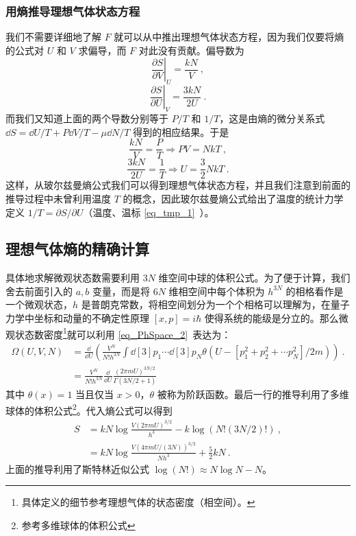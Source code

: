 \subsubsection{用熵推导理想气体状态方程}
我们不需要详细地了解 $F$ 就可以从中推出理想气体状态方程，因为我们仅要将熵的公式对 $U $ 和 $V$ 求偏导，而 $F$ 对此没有贡献。偏导数为
\begin{equation}
\left. \frac{\partial S}{\partial V} \right |_{U}^{}=\frac{kN}{V}~,
\end{equation}
\begin{equation}
\left. \frac{\partial S}{\partial U}\right |_{V}^{}=\frac{3kN}{2U}~.
\end{equation}
而我们又知道上面的两个导数分别等于 $P/T$ 和 $1/T$，这是由熵的微分关系式 $\dd S=\dd U/T+P\dd V/T-\mu \dd N/T$ 得到的相应结果。于是
\begin{equation}
\dfrac{kN}{V}=\dfrac{P}{T}\Rightarrow PV=NkT~,
\end{equation}
\begin{equation}
\dfrac{3kN}{2U} = \dfrac{1}{T}\Rightarrow U=\frac{3}{2}NkT~.
\end{equation}
这样，从玻尔兹曼熵公式我们可以得到理想气体状态方程，并且我们注意到前面的推导过程中未曾利用温度 $T$ 的概念，因此玻尔兹曼熵公式给出了温度的统计力学定义 $1/T=\partial S/\partial U$（温度、温标 \autoref{eq_tmp_1}~）。
\subsection{理想气体熵的精确计算}
具体地求解微观状态数需要利用 $3N$ 维空间中球的体积公式。为了便于计算，我们舍去前面引入的 $a,b$ 变量，而是将 $6N$ 维相空间中每个体积为 $h^{3N}$ 的相格看作是一个微观状态，$h$ 是普朗克常数，将相空间划分为一个个相格可以理解为，在量子力学中坐标和动量的不确定性原理 $[x,p]=i\hbar$ 使得系统的能级是分立的。那么微观状态数密度\footnote{具体定义的细节参考理想气体的状态密度（相空间）。}就可以利用 \autoref{eq_PhSpace_2}~表达为：
\begin{equation}
\begin{aligned}
\Omega(U,V,N)&=\frac{\dd }{\dd U}\left(\frac{V^N}{N! h^{3N}}\int \dd[3]{p_1}\cdots \dd[3]{p_N} \theta(U-[p_1^2+p_2^2+\cdots p_N^2]/2m)\right) ~.
\\
&=\frac{V^N}{N! h^{3N}} \frac{\dd}{\dd U} \frac{(2\pi m U)^{3N/2}}{\Gamma(3N/2+1)}
\end{aligned}
\end{equation}
其中 $\theta(x)=1$ 当且仅当 $x>0$，$\theta$ 被称为阶跃函数。最后一行的推导利用了多维球体的体积公式\footnote{参考多维球体的体积公式 }。代入熵公式可以得到
\begin{equation}
\begin{aligned}
S&=kN\log \frac{V(2\pi mU)^{3/2}}{h^3}-k\log (N! (3N/2)!)~,
\\
&=kN\log \frac{V(4\pi m U/(3N))^{3/2}}{Nh^3}+\frac{5}{2}kN ~.
\end{aligned}
\end{equation}
上面的推导利用了斯特林近似公式 $\log(N!)\approx N\log N-N$。

